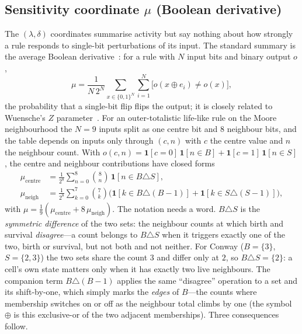 \documentclass{article}
\begin{document}
\subsection{Sensitivity coordinate $\mu$ (Boolean derivative)}
\label{sec:mu}

The $(\lambda,\delta)$ coordinates summarise activity but say nothing about how
strongly a rule responds to single-bit perturbations of its input. The standard
summary is the average Boolean derivative~\cite{vichniac1990,binder1993}: for a
rule with $N$ input bits and binary output $o$,
\begin{equation}
  \mu=\frac{1}{N\,2^{N}}\sum_{x\in\{0,1\}^N}\sum_{i=1}^{N}
  \bigl[o(x\oplus e_i)\neq o(x)\bigr],
\end{equation}
the probability that a single-bit flip flips the output; it is closely related to
Wuensche's $Z$ parameter~\cite{wuensche1999}. For an outer-totalistic life-like
rule on the Moore neighbourhood the $N=9$ inputs split as one centre bit and $8$
neighbour bits, and the table depends on inputs only through $(c,n)$ with $c$ the
centre value and $n$ the neighbour count. With $o(c,n)=\mathbf 1[c{=}0]\,\mathbf
1[n\in B]+\mathbf 1[c{=}1]\,\mathbf 1[n\in S]$, the centre and neighbour
contributions have closed forms
\begin{align}
  \mu_{\text{centre}}&=\frac{1}{2^{8}}\sum_{n=0}^{8}\binom{8}{n}\,
    \mathbf 1[n\in B\triangle S],\\
  \mu_{\text{neigh}}&=\frac{1}{2^{8}}\sum_{k=0}^{7}\binom{7}{k}
    \bigl(\mathbf 1[k\in B\triangle(B{-}1)]+\mathbf 1[k\in S\triangle(S{-}1)]\bigr),
\end{align}
with $\mu=\tfrac19(\mu_{\text{centre}}+8\,\mu_{\text{neigh}})$. The notation needs a
word. $B\triangle S$ is the \emph{symmetric difference} of the two sets: the
neighbour counts at which birth and survival \emph{disagree}---a count belongs to
$B\triangle S$ when it triggers exactly one of the two, birth or survival, but not
both and not neither. For Conway ($B=\{3\}$, $S=\{2,3\}$) the two sets share the
count $3$ and differ only at $2$, so $B\triangle S=\{2\}$: a cell's own state
matters only when it has exactly two live neighbours. The companion term
$B\triangle(B{-}1)$ applies the same ``disagree'' operation to a set and its
shift-by-one, which simply marks the \emph{edges} of $B$---the counts where
membership switches on or off as the neighbour total climbs by one (the symbol
$\oplus$ is this exclusive-or of the two adjacent memberships). Three consequences
follow.
\end{document}
